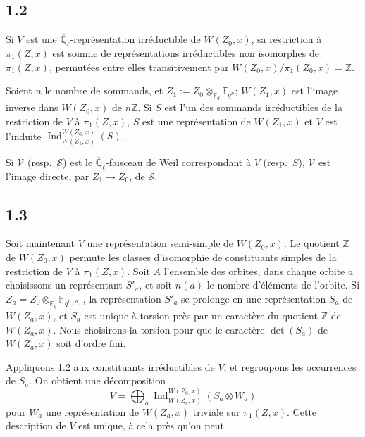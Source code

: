 \documentclass[10pt,a4paper]{article}
\theoremstyle{plain}
\theoremstyle{definition}
\DeclareMathOperator{\Ind}{Ind}
\begin{document}
\subsection*{1.2}

Si $V$ est une $\overline{\mathbb{Q}}_\ell$-repr\'esentation irr\'eductible de $W(Z_0,x)$, sa restriction \`a $\pi_1(Z,x)$ est somme de repr\'esentations irr\'eductibles non isomorphes de $\pi_1(Z,x)$, permut\'ees entre elles transitivement par $W(Z_0,x)/\pi_1(Z_0,x) = \mathbb{Z}$.

Soient $n$ le nombre de sommands, et $Z_1 := Z_0 \otimes_{\mathbb{F}_q} \mathbb{F}_{q^n}$; $W(Z_1,x)$ est l'image inverse dans $W(Z_0,x)$ de $n\mathbb{Z}$. Si $S$ est l'un des sommands irr\'eductibles de la restriction de $V$ \`a $\pi_1(Z,x)$, $S$ est une repr\'esentation de $W(Z_1,x)$ et $V$ est l'induite $\Ind_{W(Z_1,x)}^{W(Z_0,x)}(S)$.

Si $\mathcal{V}$ (resp.~$\mathcal{S}$) est le $\overline{\mathbb{Q}}_\ell$-faisceau de Weil correspondant \`a $V$ (resp.~$S$), $\mathcal{V}$ est l'image directe, par $Z_1 \to Z_0$, de $\mathcal{S}$.

\subsection*{1.3}

Soit maintenant $V$ une repr\'esentation semi-simple de $W(Z_0,x)$. Le quotient $\mathbb{Z}$ de $W(Z_0,x)$ permute les classes d'isomorphie de constituants simples de la restriction de $V$ \`a $\pi_1(Z,x)$. Soit $A$ l'ensemble des orbites, dans chaque orbite $a$ choisissons un repr\'esentant $S'_a$, et soit $n(a)$ le nombre d'\'el\'ements de l'orbite. Si $Z_a = Z_0 \otimes_{\mathbb{F}_q} \mathbb{F}_{q^{n(a)}}$, la repr\'esentation $S'_a$ se prolonge en une repr\'esentation $S_a$ de $W(Z_a,x)$, et $S_a$ est unique \`a torsion pr\`es par un caract\`ere du quotient $\mathbb{Z}$ de $W(Z_a,x)$. Nous choisirons la torsion pour que le caract\`ere $\det(S_a)$ de $W(Z_a,x)$ soit d'ordre fini.

Appliquons 1.2 aux constituants irr\'eductibles de $V$, et regroupons les occurrences de $S_a$. On obtient une d\'ecomposition
\begin{equation}\label{eq:1.3.1}
V = \bigoplus_a \Ind_{W(Z_a,x)}^{W(Z_0,x)}(S_a \otimes W_a)
\end{equation}
pour $W_a$ une repr\'esentation de $W(Z_a,x)$ triviale sur $\pi_1(Z,x)$. Cette description de $V$ est unique, \`a cela pr\`es qu'on peut
\end{document}

